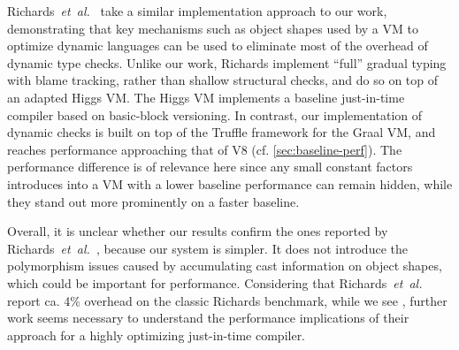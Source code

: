 Richards~\textit{et~al.}~\cite{Richards2017} take a similar implementation
approach to our work, demonstrating that key mechanisms such as object shapes
used by a VM to optimize dynamic languages can be used to eliminate most of
the overhead of dynamic type checks.
Unlike our work, Richards
implement ``full'' gradual typing with blame tracking, rather than
shallow structural checks, and do so on top of an adapted Higgs
VM.
The Higgs VM implements a baseline just-in-time compiler based on
basic-block versioning\citep{Chevalier-Boisvert:2016:ITS}.
In contrast, our implementation of dynamic checks
is built on top of the Truffle framework for the Graal VM, and reaches
performance approaching that of V8 (cf. \cref{sec:baseline-perf}).
The performance difference is of relevance here since any small constant factors
introduces into a VM with a lower baseline performance can remain hidden,
while they stand out more prominently on a faster baseline.

Overall, it is unclear whether our results confirm the ones
reported by Richards~\textit{et~al.}~\cite{Richards2017},
because our system is simpler.
It does not introduce the polymorphism
issues caused by accumulating cast information on object shapes,
which could be important for performance.
Considering that Richards~\textit{et~al.} report ca. 4\% overhead
on the classic Richards benchmark, while we see \OverheadRichardsP,
further work seems necessary to understand the performance implications of
their approach for a highly optimizing just-in-time compiler.

%



